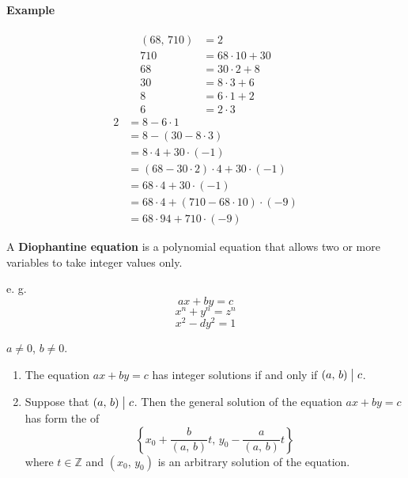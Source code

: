 \paragraph{Example}
\begin{align*}
    \left(68,\,710\right) &= 2 \\
    710 &= 68 \cdot 10 + 30 \\
    68 &= 30 \cdot 2 + 8 \\
    30 &= 8 \cdot 3 + 6 \\
    8 &= 6 \cdot 1 + 2 \\
    6 &= 2 \cdot 3
\end{align*}
\begin{align*}
    2 &= 8 - 6\cdot 1 \\
    &= 8 - \left(30 - 8 \cdot 3\right) \\
    &= 8 \cdot 4 + 30 \cdot \left(-1\right) \\
    &= \left(68-30\cdot 2\right) \cdot 4 + 30\cdot\left(-1\right) \\
    &= 68 \cdot 4 + 30 \cdot \left(-1\right) \\
    &= 68 \cdot 4 + \left(710 - 68 \cdot 10\right) \cdot \left(-9\right) \\
    &= 68 \cdot 94 + 710 \cdot \left(-9\right)
\end{align*}

\begin{definition}
    A \textbf{Diophantine equation} is a polynomial equation that allows two or more variables
    to take integer values only.
\end{definition}

e. g.
\[ax+by=c\] \[x^n+y^n=z^n\] \[x^2-dy^2=1\]

\begin{theorem}
    $a\neq 0$, $b\neq 0$.
    \begin{enumerate}
        \item The equation $ax+by=c$ has integer solutions if and only if
        $\left(a,\,b\right) \bigm| c$.
        \item Suppose that $\left(a,\,b\right) \bigm| c$.
        Then the general solution of the equation $ax+by=c$ has form the of
        \[
            \left\{x_0 + \frac{b}{\left(a,\,b\right)}t,\, y_0 - \frac{a}{\left(a,\,b\right)}t\right\}    
        \]
        where $t \in \mathbb{Z}$ and $\left(x_0,\,y_0\right)$ is an arbitrary solution of the equation.
    \end{enumerate}
\end{theorem}



